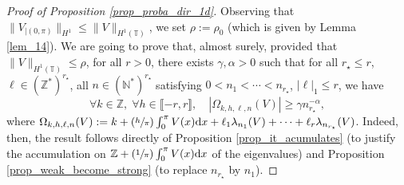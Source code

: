 \documentclass[JEP,XML,SOM,Unicode,NoEqCountersInSection,published]{cedram}
\newcommand{\Psfrac}[2]{(\sfrac{#1}{#2})}
\theoremstyle{definition}
\begin{document}
\begin{proof}[Proof of Proposition \ref{prop_proba_dir_1d}] Observing that $\| V_{|(0,\pi)}\|_{H^1} \leq \| V\|_{H^1(\mathbb{T})}$, we set $\rho:= \rho_0$ (which is given by Lemma \ref{lem_14}). We are going to prove that, almost surely, provided that $\| V\|_{H^1(\mathbb{T})} \leq \rho$, for all $r>0$, there exists $\gamma,\alpha>0$ such that for all $r_\star \leq r$, $\ell \in (\mathbb{Z}^*)^{r_\star}$, all $n \in (\mathbb{N}^*)^{r_\star}$ satisfying $0<n_1<\cdots<n_{r_\star}$, $|\ell|_1 \leq r$, we have
\begin{equation}
\label{eq_weak_NLS}
\forall k \in \mathbb{Z},\;\forall h\in \llbracket -r,r \rrbracket, \quad | \Omega_{k,h,\ell,n}(V) | \geq \gamma n_{r_\star}^{-\alpha},
\end{equation}
where
$\Omega_{k,h,\ell,n}(V):= k+\Psfrac{h}\pi \int_0^\pi V(x) \mathrm{d}x + \ell_1 \lambda_{n_1}(V)+\cdots+\ell_r \lambda_{n_{r_\star}}(V)$.
Indeed, then, the result follows directly of Proposition \ref{prop_it_acumulates} (to justify the accumulation on $\mathbb{Z}+ \Psfrac1\pi \int_0^\pi V(x) \mathrm{d}x$ of the eigenvalues) and Proposition \ref{prop_weak_become_strong} (to replace $n_{r_\star}$ by $n_{1}$).


\end{proof}
\end{document}
